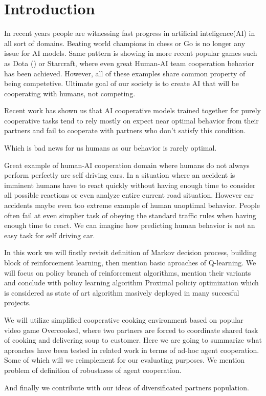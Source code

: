 \chapter*{Introduction}

In recent years people are witnessing fast progress in artificial inteligence(AI) in all sort of domains. 
Beating world champions in chess or Go is no longer any issue for AI models. 
Same pattern is showing in more recent popular games such as Dota (\cite{DotaOpenFive}) or Starcraft, where even great Human-AI team cooperation behavior has been achieved.
However, all of these examples share common property of being competetive.
Ultimate goal of our society is to create AI that will be cooperating with humans, not competing.

Recent work has shown us that AI cooperative models trained together for purely cooperative tasks tend to rely mostly on expect near optimal behavior from their partners and fail to cooperate with partners who don't satisfy this condition.

Which is bad news for us humans as our behavior is rarely optimal.

Great example of human-AI cooperation domain where humans do not always perform perfectly are self driving cars. 
In a situation where an accident is imminent humans have to react quickly without having enough time to consider all possible reactions or even analyze entire current road situation.
However car accidents maybe even too extreme example of human unoptimal behavior. 
People often fail at even simplier task of obeying the standard traffic rules when having enough time to react.
We can imagine how predicting human behavior is not an easy task for self driving car. 

In this work we will firstly revisit definition of Markov decision process, building block of reinforcement learning, then mention basic aproaches of Q-learning.
We will focus on policy branch of reinforcement algorithms, mention their variants and conclude with policy learning algorithm Proximal policiy optimization which is considered as state of art algorithm masively deployed in many succesful projects.

We will utilize simplified cooperative cooking environment based on popular video game Overcooked, where two partners are forced to coordinate shared task of cooking and delivering soup to customer.
Here we are going to summarize what aproaches have been tested in related work in terms of ad-hoc agent cooperation.
Some of which will we reimplement for our evaluating purposes.
We mention problem of definition of robustness of agent cooperation.

And finally we contribute with our ideas of diversificated partners population. 